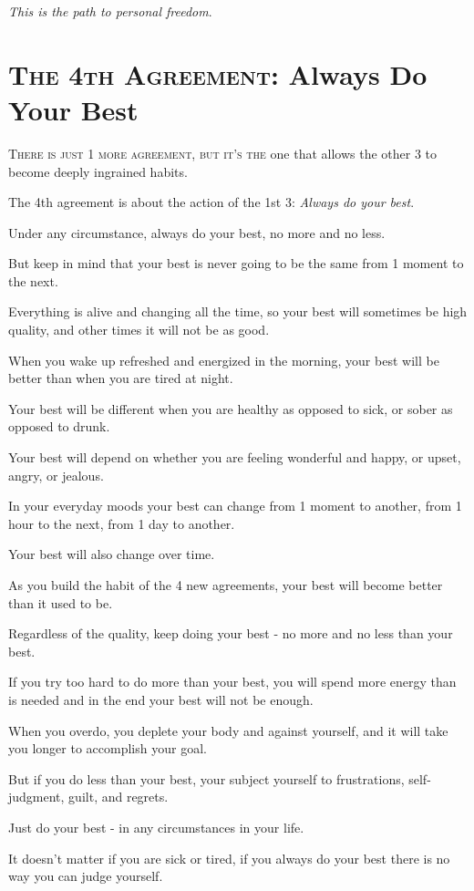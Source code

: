 \documentclass{article}
\numberwithin{equation}{section}
\begin{document}
\textit{This is the path to personal freedom}.

\section{\textsc{The 4th Agreement}: Always Do Your Best}
\textsc{There is just 1 more agreement, but it's the} one that allows the other 3 to become deeply ingrained habits.

The 4th agreement is about the action of the 1st 3: \textit{Always do your best}.

%
Under any circumstance, always do your best, no more and no less.

But keep in mind that your best is never going to be the same from 1 moment to the next.

Everything is alive and changing all the time, so your best will sometimes be high quality, and other times it will not be as good.

When you wake up refreshed and energized in the morning, your best will be better than when you are tired at night.

Your best will be different when you are healthy as opposed to sick, or sober as opposed to drunk.

Your best will depend on whether you are feeling wonderful and happy, or upset, angry, or jealous.

%
In your everyday moods your best can change from 1 moment to another, from 1 hour to the next, from 1 day to another.

Your best will also change over time.

As you build the habit of the 4 new agreements, your best will become better than it used to be.

%
Regardless of the quality, keep doing your best - no more and no less than your best.

If you try too hard to do more than your best, you will spend more energy than is needed and in the end your best will not be enough.

When you overdo, you deplete your body and against yourself, and it will take you longer to accomplish your goal.

But if you do less than your best, your subject yourself to frustrations, self-judgment, guilt, and regrets.

%
Just do your best - in any circumstances in your life.

It doesn't matter if you are sick or tired, if you always do your best there is no way you can judge yourself.
\end{document}
